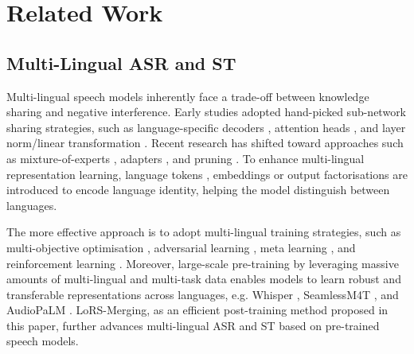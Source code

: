 \section{Related Work}
\subsection{Multi-Lingual ASR and ST}
Multi-lingual speech models inherently face a trade-off between knowledge sharing and negative interference.
Early studies adopted hand-picked sub-network sharing strategies, such as language-specific decoders \cite{dong2015multi}, attention heads \cite{zhu2020multilingual}, and layer norm/linear transformation \cite{zhang2020improving}.
Recent research has shifted toward approaches such as mixture-of-experts \cite{kwon2023mole,wang2023language}, adapters \cite{le2021lightweight,kannan2019large}, and pruning \cite{lu2022language,lai2021parp}.
To enhance multi-lingual representation learning, language tokens \cite{johnson2017google}, embeddings \cite{di2019one} or output factorisations \cite{zhang2023umluniversalmonolingualoutput} are introduced to encode language identity, helping the model distinguish between languages.

The more effective approach is to adopt multi-lingual training strategies, such as multi-objective optimisation \cite{saif2024m2asr,zhang2022streamingendtoendmultilingualspeech}, adversarial learning \cite{xiao2021adversarial}, meta learning \cite{hsu2020meta}, and reinforcement learning \cite{bai2018source}.
Moreover, large-scale pre-training by leveraging massive amounts of multi-lingual and multi-task data enables models to learn robust and transferable representations across languages, e.g. Whisper \cite{radford2023robust}, SeamlessM4T \cite{barrault2023seamlessm4t}, and AudioPaLM \cite{rubenstein2023audiopalm}. LoRS-Merging, as an efficient post-training method proposed in this paper, further advances multi-lingual ASR and ST based on pre-trained speech models.


